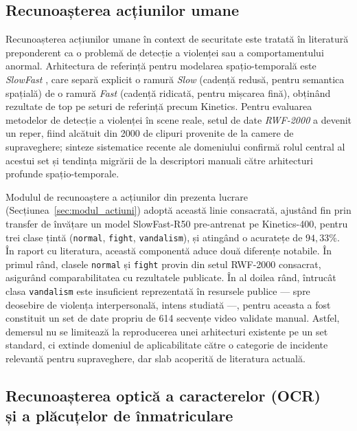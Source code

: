 \documentclass[../../main.tex]{subfiles}
\begin{document}
\subsection{Recunoașterea acțiunilor umane}
\label{subsec:cercetare_actiuni}

Recunoașterea acțiunilor umane în context de securitate este tratată în literatură preponderent ca o problemă de detecție a violenței sau a comportamentului anormal. Arhitectura de referință pentru modelarea spațio-temporală este \emph{SlowFast} \cite{slowfast2019}, care separă explicit o ramură \emph{Slow} (cadență redusă, pentru semantica spațială) de o ramură \emph{Fast} (cadență ridicată, pentru mișcarea fină), obținând rezultate de top pe seturi de referință precum Kinetics. Pentru evaluarea metodelor de detecție a violenței în scene reale, setul de date \emph{RWF-2000} \cite{rwf2000} a devenit un reper, fiind alcătuit din 2000 de clipuri provenite de la camere de supraveghere; sinteze sistematice recente ale domeniului \cite{violence_review2024} confirmă rolul central al acestui set și tendința migrării de la descriptori manuali către arhitecturi profunde spațio-temporale.

Modulul de recunoaștere a acțiunilor din prezenta lucrare (Secțiunea~\ref{sec:modul_actiuni}) adoptă această linie consacrată, ajustând fin prin transfer de învățare un model SlowFast-R50 pre-antrenat pe Kinetics-400, pentru trei clase țintă (\texttt{normal}, \texttt{fight}, \texttt{vandalism}), și atingând o acuratețe de $94{,}33\%$. În raport cu literatura, această componentă aduce două diferențe notabile. În primul rând, clasele \texttt{normal} și \texttt{fight} provin din setul RWF-2000 consacrat, asigurând comparabilitatea cu rezultatele publicate. În al doilea rând, întrucât clasa \texttt{vandalism} este insuficient reprezentată în resursele publice --- spre deosebire de violența interpersonală, intens studiată ---, pentru aceasta a fost constituit un set de date propriu de 614 secvențe video validate manual. Astfel, demersul nu se limitează la reproducerea unei arhitecturi existente pe un set standard, ci extinde domeniul de aplicabilitate către o categorie de incidente relevantă pentru supraveghere, dar slab acoperită de literatura actuală.

\subsection[Recunoașterea optică a caracterelor (OCR) și a plăcuțelor de înmatriculare]{Recunoașterea optică a caracterelor (OCR) \\ și a plăcuțelor de înmatriculare}
\label{subsec:cercetare_ocr}
\end{document}
